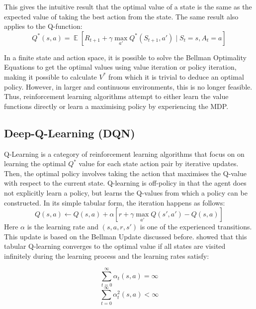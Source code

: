 \documentclass[11pt,a4paper]{report}
\DeclareMathOperator{\EX}{\mathbb{E}}
\begin{document}
This gives the intuitive result that the optimal value of a state is the same as the expected value of taking the best action from the state. The same result also applies to the Q-function:
\[
Q^*(s, a) = \EX [ R_{t+1} + \gamma \max_{a'} Q^*(S_{t+1}, a') \mid S_t = s, A_t = a ]
\] \par

In a finite state and action space, it is possible to solve the Bellman Optimality Equations to get the optimal values using value iteration or policy iteration, making it possible to calculate $V^*$ from which it is trivial to deduce an optimal policy. However, in larger and continuous environments, this is no longer feasible. Thus, reinforcement learning algorithms attempt to either learn the value functions directly or learn a maximising policy by experiencing the MDP. \par

\subsection{Deep-Q-Learning (DQN)}

Q-Learning is a category of reinforcement learning algorithms that focus on on learning the optimal $Q^*$ value for each state action pair by iterative updates. Then,  the optimal policy involves taking the action that maximises the Q-value with respect to the current state. Q-learning is off-policy in that the agent does not explicitly learn a policy, but learns the Q-values from which a policy can be constructed. In its simple tabular form, the iteration happens as follows:
\[Q(s, a) \leftarrow Q(s, a) + \alpha [ r + \gamma \max_{a'} Q(s', a') - Q(s, a) ]\]
Here $\alpha$ is the learning rate and $(s,a,r,s')$ is one of the experienced transitions. This update is based on the Bellman Update discussed before. \cite{Watkins1992} showed that this tabular Q-learning converges to the optimal value if all states are visited infinitely during the learning process and the learning rates satisfy: 

\[
\sum_{t=0}^{\infty} \alpha_t(s, a) = \infty
\]
\[
\sum_{t=0}^{\infty} \alpha_t^2(s, a) < \infty
\]
\end{document}
